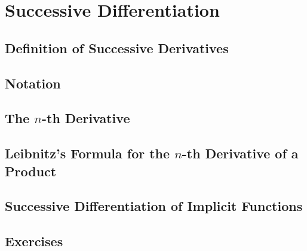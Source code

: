 \chapter{Successive Differentiation}
\label{ch:07}

\section{Definition of Successive Derivatives}
\label{sec:07:01}

\section{Notation}
\label{sec:07:02}

\section{The $n$-th Derivative}
\label{sec:07:03}

\section{Leibnitz's Formula for the $n$-th Derivative of a Product}
\label{sec:07:04}

\section{Successive Differentiation of Implicit Functions}
\label{sec:07:05}

\section{Exercises}
\label{sec:07:06}

